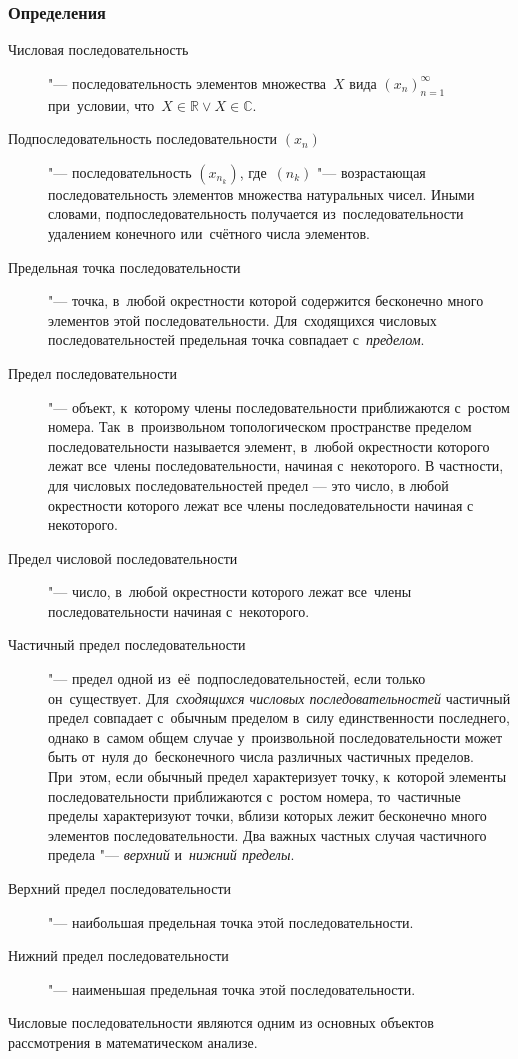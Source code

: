 \documentclass[]{scrartcl}
\begin{document}
{{\subsubsection{Определения}
\begin{description}
	\item[Числовая последовательность] "--- последовательность элементов множества~${\textstyle X}$ вида ${\textstyle (x_n)_{n=1}^{\infty}}$ при~условии, что~${\textstyle X \in \mathbb{R} \vee X \in \mathbb{C}}$.
	\item[Подпоследовательность последовательности ${\textstyle (x_n)}$] "--- последовательность ${\textstyle (x_{n_{k}})}$, где~${\textstyle (n_{k})}$ "--- возрастающая последовательность элементов множества натуральных чисел. Иными словами, подпоследовательность получается из~последовательности удалением конечного или~счётного числа элементов.
	\item[Предельная точка последовательности] "--- точка, в~любой окрестности которой содержится бесконечно много элементов этой последовательности. Для~сходящихся числовых последовательностей предельная точка совпадает с~\emph{пределом}.
	\item[Предел последовательности] "--- объект, к~которому члены последовательности приближаются с~ростом номера. Так~в~произвольном топологическом пространстве пределом последовательности называется элемент, в~любой окрестности которого лежат все~члены последовательности, начиная с~некоторого. В частности, для числовых последовательностей предел — это число, в любой окрестности которого лежат все члены последовательности начиная с некоторого.
	\item[Предел числовой последовательности] "--- число, в~любой окрестности которого лежат все~члены последовательности начиная с~некоторого.
	\item[Частичный предел последовательности] "--- предел одной из~её~подпоследовательностей, если только он~существует. Для~\emph{сходящихся числовых последовательностей} частичный предел совпадает с~обычным пределом в~силу единственности последнего, однако в~самом общем случае у~произвольной последовательности может быть от~нуля до~бесконечного числа различных частичных пределов. При~этом, если обычный предел характеризует точку, к~которой элементы последовательности приближаются с~ростом номера, то~частичные пределы характеризуют точки, вблизи которых лежит бесконечно много элементов последовательности.
	Два важных частных случая частичного предела "--- \emph{верхний} и~\emph{нижний пределы}.
	\item[Верхний предел последовательности] "--- наибольшая предельная точка этой последовательности. 
	\item[Нижний предел последовательности] "--- наименьшая предельная точка этой последовательности.
\end{description}
Числовые последовательности являются одним из основных объектов рассмотрения в математическом анализе.

}}
\end{document}
